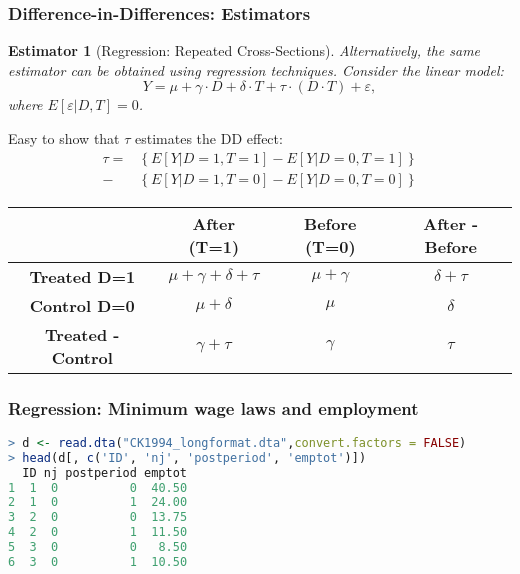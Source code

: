 \documentclass{beamer}
\numberwithin{equation}{section}
\newtheorem{esti}{Estimator}
\begin{document}
\begin{frame}
  \frametitle{Difference-in-Differences: Estimators}

\begin{esti}[Regression: Repeated Cross-Sections]\small
Alternatively, the same estimator can be obtained using regression techniques.
Consider the linear model:
\[
Y = \mu + \gamma\cdot D + \delta\cdot T + \tau \cdot (D\cdot T) + \varepsilon,
\]
where $E[\varepsilon|D,T]=0$.
\end{esti}\medskip
\begin{overprint}
Easy to show that $\tau$ estimates the DD effect:
\begin{eqnarray*}
\tau =&
\left\{
E[Y|D=1, T=1] - E[Y|D=0, T=1]
\right\}\\
-&
\left\{
E[Y|D=1, T=0] - E[Y|D=0, T=0]
\right\}
\end{eqnarray*}
\begin{center}
\small
\begin{tabular}{|c|c|c|c|}
\hline
    {\bf } & {\bf After (T=1)} & {\bf Before (T=0)} & {\bf After - Before} \\
\hline
\multirow{2}{*}{{\bf Treated D=1}}  & \multirow{2}{*}{$\mu + \gamma + \delta + \tau$} & \multirow{2}{*}{$\mu + \gamma$} & \multirow{2}{*}{$\delta + \tau$}    \\
 & & & \\
\hline
\multirow{2}{*}{{\bf Control D=0}}   & \multirow{2}{*}{$\mu +  \delta$} & \multirow{2}{*}{$\mu$} & \multirow{2}{*}{$\delta$}    \\
 & & & \\
\hline
\multirow{2}{*}{{\bf Treated - Control}}   & \multirow{2}{*}{$\gamma + \tau$} & \multirow{2}{*}{$\gamma$} & \multirow{2}{*}{$\tau$}    \\
 & & & \\
\hline
\end{tabular}
\end{center}
\end{overprint}
\end{frame}

\begin{frame}[fragile]
  \frametitle{Regression: Minimum wage laws and employment}

\footnotesize
\begin{lstlisting}[language=R, basicstyle=\ttfamily]
> d <- read.dta("CK1994_longformat.dta",convert.factors = FALSE)
> head(d[, c('ID', 'nj', 'postperiod', 'emptot')])
  ID nj postperiod emptot
1  1  0          0  40.50
2  1  0          1  24.00
3  2  0          0  13.75
4  2  0          1  11.50
5  3  0          0   8.50
6  3  0          1  10.50
\end{lstlisting}
\end{frame}
\end{document}
